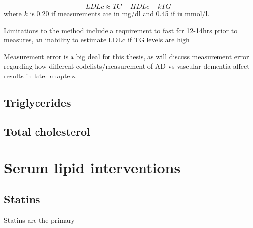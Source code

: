 \documentclass[a4paper, twoside]{templates/ociamthesis}
\begin{document}
\[LDLc \approx TC - HDLc - kTG\] where \(k\) is 0.20 if measurements are in mg/dl and 0.45 if in mmol/l.

Limitations to the method include a requirement to fast for 12-14hrs prior to measures, an inability to estimate LDLc if TG levels are high

\begin{correction}
Measurement error is a big deal for this thesis, as will discuss
measurement error regarding how different codelists/measurement of AD vs
vascular dementia affect results in later chapters.
\end{correction}

\hypertarget{triglycerides}{%
\subsection{Triglycerides}\label{triglycerides}}

\hypertarget{total-cholesterol}{%
\subsection{Total cholesterol}\label{total-cholesterol}}

\hypertarget{serum-lipid-interventions}{%
\section{Serum lipid interventions}\label{serum-lipid-interventions}}

\hypertarget{statins}{%
\subsection{Statins}\label{statins}}

Statins are the primary
\end{document}
